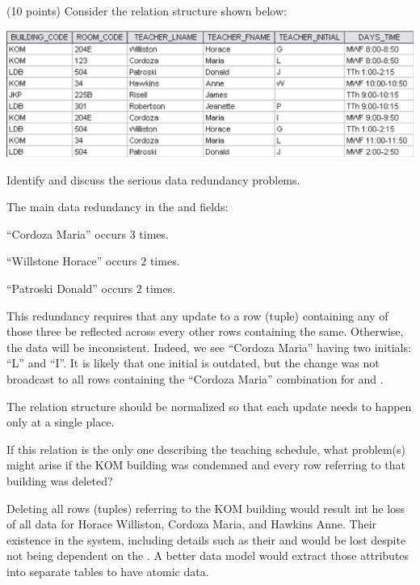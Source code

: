 

\begin{problem} (10 points)
  Consider the relation structure shown below:

  \bigskip

  \includegraphics[scale=0.8]{01.png}

  \begin{enumalph}
    \item Identify and discuss the serious data redundancy problems.
    \begin{Answer}
      The main data redundancy in the 
      and  fields:
      \begin{enumalph}
        \item ``Cordoza Maria'' occurs $3$ times.
        \item ``Willstone Horace'' occurs $2$ times.
        \item ``Patroski Donald'' occurs $2$ times.
      \end{enumalph}
	
      \bigskip
      This redundancy requires that any update to a row (tuple) containing
      any of those three be reflected across every other rows containing the same.
      Otherwise, the data will be inconsistent.
      Indeed, we see ``Cordoza Maria'' having two initials: ``L'' and ``I''.
      It is likely that one initial is outdated, but the change
      was not broadcast to all rows containing the ``Cordoza Maria'' combination
      for  and .

      The relation structure should be normalized so that
      each update needs to happen only at a single place.
    \end{Answer}
    \item  If this relation is the only one describing the teaching schedule,
    what problem(s) might arise if the KOM building was condemned
    and every row referring to that building was deleted?
    \begin{Answer}

      Deleting all rows (tuples) referring to the KOM building
      would result int he loss of all data for
      Horace Williston, Cordoza Maria, and Hawkins Anne.
      Their existence in the system, including details such as their
       and  would be lost
      despite not being dependent on the .
      A better data model would extract those attributes into separate tables
      to have atomic data.
    \end{Answer}
  \end{enumalph}

\end{problem}
